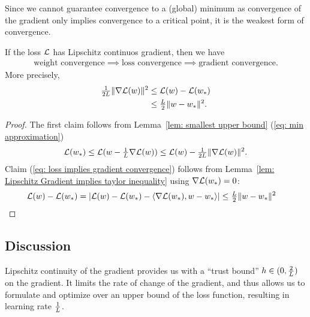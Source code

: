 Since we cannot guarantee convergence to a (global) minimum as convergence of
the gradient only implies convergence to a critical point, it is the weakest
form of convergence.

\begin{theorem}\label{thm: convergence chain}
	If the loss \(\mathcal{L}\) has Lipschitz continuos gradient, then we have
	\begin{align*}
		\text{weight convergence}
		\implies \text{loss convergence}
		\implies \text{gradient convergence}.
	\end{align*}
	More precisely,
	\begin{align}
	\label{eq: weight implies loss convergence}
		\tfrac{1}{2L}\|\nabla\mathcal{L}(w)\|^2
		&\le \mathcal{L}(w) - \mathcal{L}(w_*)\\
	\label{eq: loss implies gradient convergence}
		&\le \tfrac{L}{2}\|w-w_*\|^2.
	\end{align}
\end{theorem}
\begin{proof}
	The first claim follows from Lemma~\ref{lem: smallest upper bound} (\ref{eq: min approximation})
	\begin{align*}
		\mathcal{L}(w_*) \le \mathcal{L}(w -\tfrac{1}{L}\nabla\mathcal{L}(w))
		\le \mathcal{L}(w) - \tfrac{1}{2L}\|\nabla\mathcal{L}(w)\|^2.
	\end{align*}
	Claim (\ref{eq: loss implies gradient convergence}) follows from Lemma~\ref{lem:
	Lipschitz Gradient implies taylor inequality} using
	\(\nabla\mathcal{L}(w_*)=0\):
	\begin{align*}
		\mathcal{L}(w) - \mathcal{L}(w_*)
		= |\mathcal{L}(w) - \mathcal{L}(w_*) - \langle \nabla\mathcal{L}(w_*), w-w_*\rangle|
		&\le \tfrac{L}{2}\|w-w_*\|^2
		\qedhere
	\end{align*}
\end{proof}

\subsection{Discussion}

Lipschitz continuity of the gradient provides us with a ``trust bound''
\(h\in(0,\frac{2}{L})\) on the gradient. It limits the rate of change of the
gradient, and thus allows us to formulate and optimize over an upper bound of
the loss function, resulting in learning rate \(\frac{1}{L}\).

